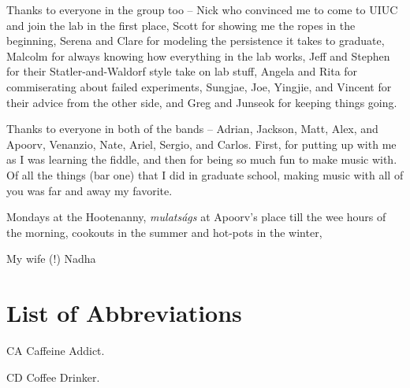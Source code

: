 \documentclass[edeposit,fullpage,draftthesis]{uiucthesis2009}
\begin{document}
Thanks to everyone in the group too -- Nick who convinced me to come to UIUC and join
the lab in the first place, Scott for showing me the ropes in the beginning, Serena and Clare 
for modeling the persistence it takes to graduate, Malcolm for always knowing how
everything in the lab works, Jeff and Stephen for their Statler-and-Waldorf style take
on lab stuff, Angela and Rita for commiserating about failed experiments, Sungjae, Joe, Yingjie,
and Vincent for their advice from the other side, and Greg and Junseok for keeping things going.

Thanks to everyone in both of the bands -- Adrian, Jackson, Matt, Alex, and Apoorv,
Venanzio, Nate, Ariel, Sergio, and Carlos. First, for putting up with me as I
was learning the fiddle, and then for being so much fun to make music with.
Of all the things (bar one) that I did in graduate school, making music
with all of you was far and away my favorite.

Mondays at the Hootenanny, \textit{mulats\'{a}gs} at Apoorv's place till the wee hours of the morning,
cookouts in the summer and hot-pots in the winter,

My wife (!) Nadha


\setcounter{tocdepth}{2}

\tableofcontents
\listoftables
\listoffigures

\chapter{List of Abbreviations}

\begin{symbollist*}
\item[CA] Caffeine Addict.
\item[CD] Coffee Drinker.
\end{symbollist*}
\end{document}
